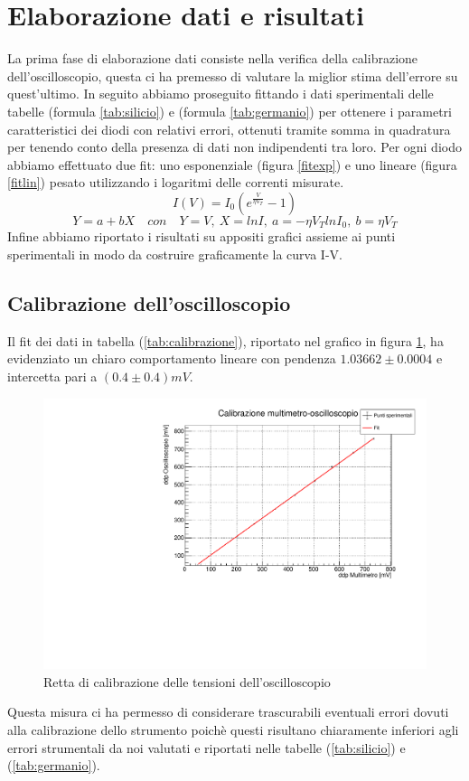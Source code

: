 \documentclass[]{article}
\begin{document}
\section{Elaborazione dati e risultati}

La prima fase di elaborazione dati consiste nella verifica della calibrazione dell'oscilloscopio, questa ci ha premesso di valutare la miglior stima dell'errore su quest'ultimo. In seguito abbiamo proseguito fittando i dati sperimentali delle tabelle (formula \ref{tab:silicio}) e (formula \ref{tab:germanio}) per ottenere i parametri caratteristici dei diodi con relativi errori, ottenuti tramite somma in quadratura per tenendo conto della presenza di dati non indipendenti tra loro. Per ogni diodo abbiamo effettuato due fit: uno esponenziale (figura \ref{fitexp}) e uno lineare (figura \ref{fitlin}) pesato utilizzando i logaritmi delle correnti misurate.
\begin{equation}
	I(V)=I_0(e^{\frac{V}{\eta V_T}}-1)
	\label{fitexp}
\end{equation}
\begin{equation}
	Y=a+bX \quad con\quad Y=V,\: X=lnI, \:a=-\eta V_{T}lnI_{0},\: b=\eta V_{T}%
	\label{fitlin}
\end{equation}
Infine abbiamo riportato i risultati su appositi grafici assieme ai punti sperimentali in modo da costruire graficamente la curva I-V. 
  \subsection{Calibrazione dell'oscilloscopio}
Il fit dei dati in tabella (\ref{tab:calibrazione}), riportato nel grafico in figura \ref{fig:calibrazione}, ha evidenziato un chiaro comportamento lineare con pendenza $1.03662\pm0.0004$ e intercetta pari a $(0.4\pm0.4)mV$.
\begin{figure}[H]
	\centering
	\includegraphics[width=0.4\linewidth]{../Silicio/Calibrazione}
	\caption{Retta di calibrazione delle tensioni dell'oscilloscopio}
	\label{fig:calibrazione}
\end{figure}
Questa misura ci ha permesso di considerare trascurabili eventuali errori dovuti alla calibrazione dello strumento poichè questi risultano chiaramente inferiori agli errori strumentali da noi valutati e riportati nelle tabelle (\ref{tab:silicio}) e (\ref{tab:germanio}).
\end{document}

